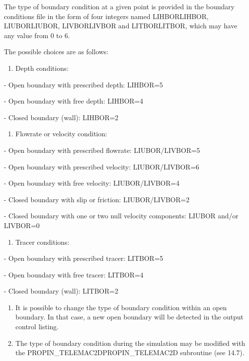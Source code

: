 \documentclass{article} %
\begin{document}
 The type of boundary condition at a given point is provided in the boundary conditions file in the form of four integers named LIHBORLIHBOR, LIUBORLIUBOR, LIVBORLIVBOR and LITBORLITBOR, which may have any value from 0 to 6.

 The possible choices are as follows:

\begin{enumerate}
\item  Depth conditions:
\end{enumerate}

 - Open boundary with prescribed depth: LIHBOR=5

 - Open boundary with free depth: LIHBOR=4

 - Closed boundary (wall): LIHBOR=2

\begin{enumerate}
\item  Flowrate or velocity condition:
\end{enumerate}

 - Open boundary with prescribed flowrate: LIUBOR/LIVBOR=5

 - Open boundary with prescribed velocity: LIUBOR/LIVBOR=6

 - Open boundary with free velocity: LIUBOR/LIVBOR=4

 - Closed boundary with slip or friction: LIUBOR/LIVBOR=2

 - Closed boundary with one or two null velocity components: LIUBOR and/or LIVBOR=0

\begin{enumerate}
\item  Tracer conditions:
\end{enumerate}

 - Open boundary with prescribed tracer: LITBOR=5

 - Open boundary with free tracer: LITBOR=4

 - Closed boundary (wall): LITBOR=2


\begin{enumerate}
\item \underbar{ }It is possible to change the type of boundary condition within an open boundary. In that case, a new open boundary will be detected in the output control listing.

\item  The type of boundary condition during the simulation may be modified with the PROPIN\_TELEMAC2DPROPIN\_TELEMAC2D subroutine (see 14.7).
\end{enumerate}
\end{document}
